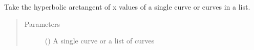\documentclass[letterpaper,10pt,english]{sphinxmanual}
\begin{document}
\begin{fulllineitems}
\label{\detokenize{pydv:pydvpy.atanhx}}
Take the hyperbolic arctangent of x values of a single curve or curves in a list.

\begin{sphinxVerbatim}[commandchars=\\\{\}]
  
\end{sphinxVerbatim}

\begin{sphinxVerbatim}[commandchars=\\\{\}]
\end{sphinxVerbatim}
\begin{quote}\begin{description}
\item[{Parameters}] \leavevmode
{} () \textendash{} A single curve or a list of curves

\end{description}\end{quote}

\end{fulllineitems}

\end{document}
